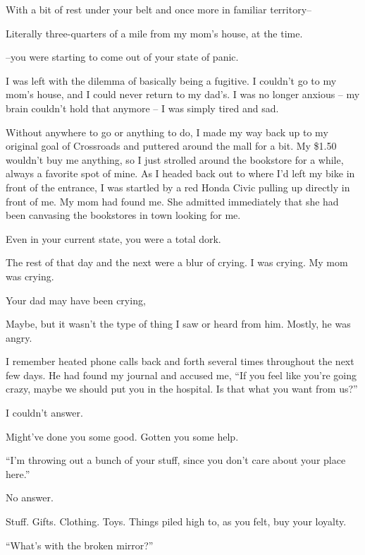 \begin{paracol}{2}
\begin{leftcolumn}
\begin{ally}
With a bit of rest under your belt and once more in familiar territory--
\end{ally}
Literally three-quarters of a mile from my mom's house, at the time.

\begin{ally}
--you were starting to come out of your state of panic.
\end{ally}
I was left with the dilemma of basically being a fugitive. I couldn't go to my mom's house, and I could never return to my dad's. I was no longer anxious -- my brain couldn't hold that anymore -- I was simply tired and sad.

Without anywhere to go or anything to do, I made my way back up to my original goal of Crossroads and puttered around the mall for a bit. My \$1.50 wouldn't buy me anything, so I just strolled around the bookstore for a while, always a favorite spot of mine. As I headed back out to where I'd left my bike in front of the entrance, I was startled by a red Honda Civic pulling up directly in front of me. My mom had found me. She admitted immediately that she had been canvasing the bookstores in town looking for me.

\begin{ally}
Even in your current state, you were a total dork.
\end{ally}
The rest of that day and the next were a blur of crying. I was crying. My mom was crying.

\begin{ally}
Your dad may have been crying,
\end{ally}
Maybe, but it wasn't the type of thing I saw or heard from him. Mostly, he was angry.

I remember heated phone calls back and forth several times throughout the next few days. He had found my journal and accused me, ``If you feel like you're going crazy, maybe we should put you in the hospital. Is that what you want from us?''

I couldn't answer.

\begin{ally}
Might've done you some good. Gotten you some help.
\end{ally}
``I'm throwing out a bunch of your stuff, since you don't care about your place here.''

No answer.

\begin{ally}
Stuff. Gifts. Clothing. Toys. Things piled high to, as you felt, buy your loyalty.
\end{ally}
``What's with the broken mirror?''


\end{leftcolumn}
\end{paracol}
